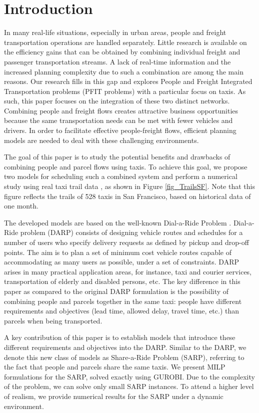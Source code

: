 \documentclass[preprint,authoryear,12pt]{elsarticle}
\begin{document}
\section{Introduction}
\label{Introduction}
In many real-life situations, especially in urban areas, people and freight transportation operations are handled separately. Little research is available on the efficiency gains that can be obtained by combining individual freight and passenger transportation streams. A lack of real-time information and the increased planning complexity due to such a combination are among the main reasons. Our research fills in this gap and explores People and Freight Integrated Transportation problems (PFIT problems) with a particular focus on taxis. As such, this paper focuses on the integration of these two distinct networks. Combining people and freight flows creates attractive business opportunities because the same transportation needs can be met with fewer vehicles and drivers. In order to facilitate effective people-freight flows, efficient planning models are needed to deal with these challenging environments. 

The goal of this paper is to study the potential benefits and drawbacks of combining people and parcel flows using taxis. To achieve this goal, we propose two models for scheduling such a combined system and perform a numerical study using real taxi trail data \citep{TaxiSFOnline}, as shown in Figure \ref{fig_TrailsSF}. Note that this figure reflects the trails of 528 taxis in San Francisco, based on historical data of one month.



The developed models are based on the well-known Dial-a-Ride Problem \citep{Cordeau}. Dial-a-Ride problem (DARP) consists of designing vehicle routes and schedules for a number of users who specify delivery requests as defined by pickup and drop-off points. The aim is to plan a set of minimum cost vehicle routes capable of accommodating as many users as possible, under a set of constraints. DARP arises in many practical application areas, for instance, taxi and courier services, transportation of elderly and disabled persons, etc. The key difference in this paper as compared to the original DARP formulation is the possibility of combining people and parcels together in the same taxi: people have different requirements and objectives (lead time, allowed delay, travel time, etc.) than parcels when being transported.

A key contribution of this paper is to establish models that introduce these different requirements and objectives into the DARP. Similar to the DARP, we denote this new class of models as Share-a-Ride Problem (SARP), referring to the fact that people and parcels share the same taxis. We present MILP formulations for the SARP, solved exactly using GUROBI. Due to the complexity of the problem, we can solve only small SARP instances. To attend a higher level of realism, we provide numerical results for the SARP under a dynamic environment.
\end{document}
